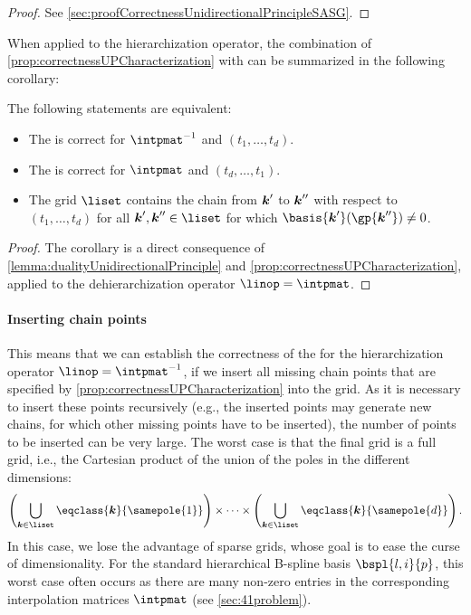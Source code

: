 \begin{proof}
  See \cref{sec:proofCorrectnessUnidirectionalPrincipleSASG}.
\end{proof}

When applied to the hierarchization operator,
the combination of \cref{prop:correctnessUPCharacterization} with
 can be summarized in
the following corollary:

\begin{corollary}
  \label{cor:equivalentCorrectnessUPHierarchization}
  The following statements are equivalent:
  \begin{itemize}
    \item
    The \up is correct for $\intpmatinv$ and $(t_1, \dotsc, t_d)$.
    
    \item
    The \up is correct for $\intpmat$ and $(t_d, \dotsc, t_1)$.
    
    \item
    The grid $\liset$ contains the chain from ${\boldsymbol{k}}'$ to ${\boldsymbol{k}}''$
    with respect to $(t_1, \dotsc, t_d)$ for all $\*k', \*k'' \in \liset$
    for which $\basis{\*k'}(\gp{\*k''}) \not= 0$.
  \end{itemize}
\end{corollary}

\begin{proof}
  The corollary is a direct consequence of
  \cref{lemma:dualityUnidirectionalPrinciple} and
  \cref{prop:correctnessUPCharacterization},
  applied to the dehierarchization operator $\linop = \intpmat$.
\end{proof}

\paragraph{Inserting chain points}

This means that we can establish the correctness of the \up
for the hierarchization operator $\linop = \intpmatinv$,
if we insert all missing chain points that are specified by
\cref{prop:correctnessUPCharacterization} into the grid.
As it is necessary to insert these points recursively
(e.g., the inserted points may generate new chains,
for which other missing points have to be inserted),
the number of points to be inserted can be very large.
The worst case is that the final grid is a full grid, i.e.,
the Cartesian product of the union of the poles in the different dimensions:
\begin{equation}
  \left(\bigcup_{\*k \in \liset} \eqclass{\*k}{\samepole{1}}\right)
  \times \dotsb \times
  \left(\bigcup_{\*k \in \liset} \eqclass{\*k}{\samepole{d}}\right).
\end{equation}
In this case, we lose the advantage of sparse grids,
whose goal is to ease the curse of dimensionality.
For the standard hierarchical B-spline basis $\bspl{l,i}{p}$,
this worst case often occurs as there are many non-zero entries
in the corresponding interpolation matrices $\intpmat$
(see \cref{sec:41problem}).

